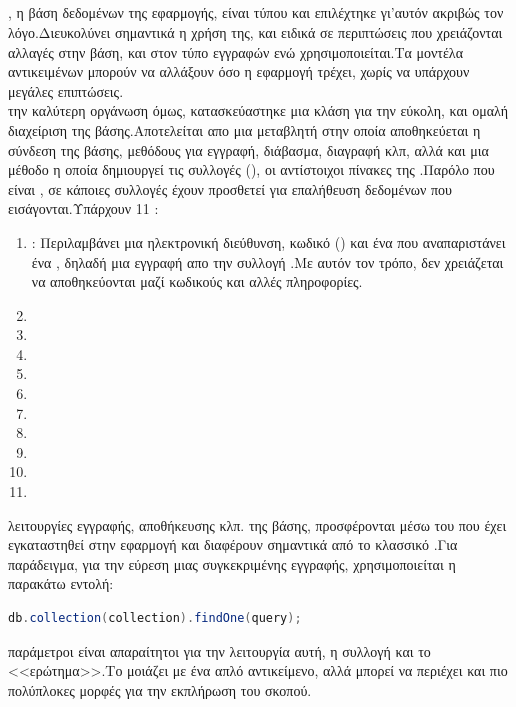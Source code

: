 \subsection{}
\pSpace{}, η βάση δεδομένων της εφαρμογής, είναι τύπου  και επιλέχτηκε γι'αυτόν ακριβώς τον λόγο.Διευκολύνει σημαντικά η χρήση της, και ειδικά σε περιπτώσεις που χρειάζονται αλλαγές στην βάση, και στον τύπο εγγραφών ενώ χρησιμοποιείται.Τα μοντέλα αντικειμένων μπορούν να αλλάξουν όσο η εφαρμογή τρέχει, χωρίς να υπάρχουν μεγάλες επιπτώσεις.\\
 την καλύτερη οργάνωση όμως, κατασκεύαστηκε μια κλάση  για την εύκολη, και ομαλή διαχείριση της βάσης.Αποτελείται απο μια μεταβλητή στην οποία αποθηκεύεται η σύνδεση της βάσης,  μεθόδους για εγγραφή, διάβασμα, διαγραφή κλπ, αλλά και μια μέθοδο η οποία δημιουργεί τις συλλογές (), οι αντίστοιχοι πίνακες της .Παρόλο που είναι , σε κάποιες συλλογές έχουν προσθετεί  για επαλήθευση δεδομένων που εισάγονται.Υπάρχουν 11 :\\
\begin{enumerate}
	\item {}: Περιλαμβάνει μια ηλεκτρονική διεύθυνση, κωδικό () και ένα  που αναπαριστάνει ένα , δηλαδή μια εγγραφή απο την συλλογή .Με αυτόν τον τρόπο, δεν χρειάζεται να αποθηκεύονται μαζί κωδικούς και αλλές πληροφορίες.
	\item {}
	\item {}
	\item {}
	\item {}
	\item {}
	\item {}
	\item {}
	\item {}
	\item {}
	\item {}
\end{enumerate}
 λειτουργίες εγγραφής, αποθήκευσης κλπ. της βάσης, προσφέρονται μέσω του  που έχει εγκαταστηθεί στην εφαρμογή και διαφέρουν σημαντικά από το κλασσικό .Για παράδειγμα, για την εύρεση μιας συγκεκριμένης εγγραφής, χρησιμοποιείται η παρακάτω εντολή:\\
	\begin{lstlisting}[language=Java]
	db.collection(collection).findOne(query);
	\end{lstlisting}
 παράμετροι είναι απαραίτητοι για την λειτουργία αυτή, η συλλογή και το <<ερώτημα>>.Το  μοιάζει με ένα απλό  αντικείμενο, αλλά μπορεί να περιέχει και πιο πολύπλοκες μορφές για την εκπλήρωση του σκοπού.

